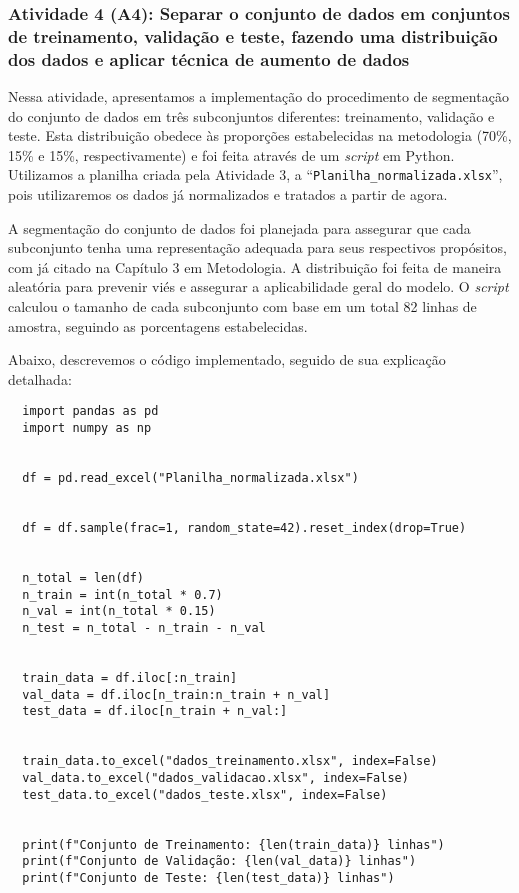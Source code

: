 \subsubsection{Atividade 4 (A4): Separar o conjunto de dados em conjuntos de treinamento, validação e teste, fazendo uma distribuição dos dados e aplicar técnica de aumento de dados}
Nessa atividade, apresentamos a implementação do procedimento de segmentação do conjunto de dados em três subconjuntos diferentes: treinamento, validação e teste. Esta distribuição obedece às proporções estabelecidas na metodologia (70\%, 15\% e 15\%, respectivamente) e foi feita através de um \textit{script} em Python. Utilizamos a planilha criada pela Atividade 3, a ``\texttt{Planilha\_normalizada.xlsx}'', pois utilizaremos os dados já normalizados e tratados a partir de agora.

A segmentação do conjunto de dados foi planejada para assegurar que cada subconjunto tenha uma representação adequada para seus respectivos propósitos, com já citado na Capítulo 3 em Metodologia. A distribuição foi feita de maneira aleatória para prevenir viés e assegurar a aplicabilidade geral do modelo. O \textit{script} calculou o tamanho de cada subconjunto com base em um total 82 linhas de amostra, seguindo as porcentagens estabelecidas.

Abaixo, descrevemos o código implementado, seguido de sua explicação detalhada:

\begin{lstlisting}
  import pandas as pd
  import numpy as np
  
  
  df = pd.read_excel("Planilha_normalizada.xlsx")
  
  
  df = df.sample(frac=1, random_state=42).reset_index(drop=True)
  
  
  n_total = len(df)
  n_train = int(n_total * 0.7)
  n_val = int(n_total * 0.15)
  n_test = n_total - n_train - n_val
  
  
  train_data = df.iloc[:n_train]
  val_data = df.iloc[n_train:n_train + n_val]
  test_data = df.iloc[n_train + n_val:]
  
  
  train_data.to_excel("dados_treinamento.xlsx", index=False)
  val_data.to_excel("dados_validacao.xlsx", index=False)
  test_data.to_excel("dados_teste.xlsx", index=False)
  
  
  print(f"Conjunto de Treinamento: {len(train_data)} linhas")
  print(f"Conjunto de Validação: {len(val_data)} linhas")
  print(f"Conjunto de Teste: {len(test_data)} linhas")
\end{lstlisting}  

